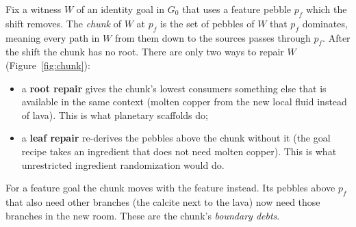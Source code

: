 Fix a witness $W$ of an identity goal in $G_0$ that uses a feature pebble $p_f$ which the shift removes. The \emph{chunk} of $W$ at $p_f$ is the set of pebbles of $W$ that $p_f$ dominates, meaning every path in $W$ from them down to the sources passes through $p_f$. After the shift the chunk has no root. There are only two ways to repair $W$ (Figure~\ref{fig:chunk}):
\begin{itemize}[nosep]
\item a \textbf{root repair} gives the chunk's lowest consumers something else that is available in the same context (molten copper from the new local fluid instead of lava). This is what planetary scaffolds do;
\item a \textbf{leaf repair} re-derives the pebbles above the chunk without it (the goal recipe takes an ingredient that does not need molten copper). This is what unrestricted ingredient randomization would do.
\end{itemize}
For a feature goal the chunk moves with the feature instead. Its pebbles above $p_f$ that also need other branches (the calcite next to the lava) now need those branches in the new room. These are the chunk's \emph{boundary debts}.

